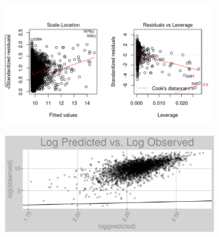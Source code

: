 \begin{figure}[h]
\centering
\begin{subfigure}{1\textwidth}
\centering
\includegraphics[width=.99\textwidth, height=0.425\textheight]{Images/natural_gas_psf_lp_res_2.png}
\end{subfigure}
\begin{subfigure}{1\textwidth}
\centering
\includegraphics[width=.99\textwidth, height=0.475\textheight]{Images/natural_gas_psf_lp_pvo.png}
\end{subfigure}
\end{figure}
\FloatBarrier
\newpage
